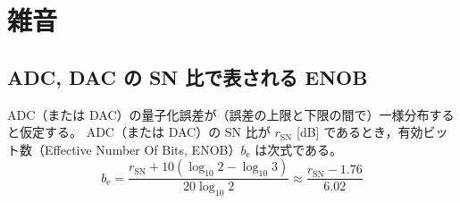 \part{雑音}
    \newcommand*{\rSN}{r_\text{SN}}
    \newcommand*{\bEff}{b_\text{e}}
    \newcommand*{\Afl}{A_\text{full}}
    \newcommand*{\An}{A_\text{n}}
    \newcommand*{\Psig}{P_\text{sig}}
    \newcommand*{\Pn}{P_\text{n}}
    \chapter{ADC, DAC の SN 比で表される ENOB}
        \begin{shadebox}
            ADC（または DAC）の量子化誤差が（誤差の上限と下限の間で）一様分布すると仮定する。
            ADC（または DAC）の SN 比が $\rSN$ [dB] であるとき，有効ビット数（Effective Number Of Bits, ENOB）$\bEff$ は次式である。
            \[ \bEff = \frac{\rSN + 10(\log_{10} 2 - \log_{10} 3)}{20\log_{10} 2} \approx \frac{\rSN - 1.76}{6.02} \]
        \end{shadebox}
